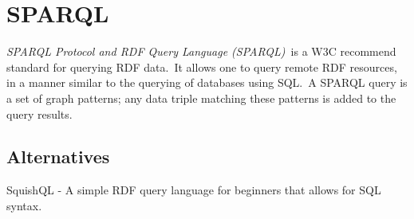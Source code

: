   \section[SPARQL Protocol and RDF Query Language (SPARQL)]{SPARQL}
  \label{sec:sparql}

  \textit{SPARQL Protocol and RDF Query Language (SPARQL)}\
  is a W3C recommend standard for querying RDF data.\
  It allows one to query remote RDF resources, in a manner similar to the querying of databases using SQL.\
  A SPARQL query is a set of graph patterns; any data triple matching these patterns is added to the query results. \citep{Jarrar_mashql:_2008}\\     
		
  \subsection{Alternatives}

  SquishQL - A simple RDF query language for beginners that allows for SQL syntax. \citep{_Mikhalenko_2013}\

